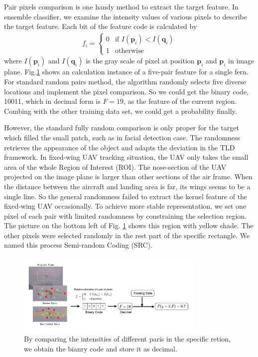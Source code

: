 Pair pixels comparison is one handy method to extract the target feature. In ensemble classifier, we examine the intensity values of various pixels to describe the target feature. Each bit of the feature code is calculated by
\begin{align}
	f_i=\left\{ \begin{array}{ll}
		0 &\mbox{if $I(\mathbf{p}_i) < I(\mathbf{q}_i)$} \\
		1 &\mbox{otherwise} \end{array} \right.
\end{align}
where $I(\mathbf{p}_i)$ and $I(\mathbf{q}_i)$ is the gray scale of pixel at position $\mathbf{p}_i$  and $\mathbf{p}_i$ in image plane. Fig.\ref{fig:01_TLD_Code} shows an calculation instance of a five-pair feature for a single fern. For standard random pairs method, the algorithm randomly selects five diverse locations and implement the pixel comparison. So we could get the binary code, 10011, which in decimal form is $F=19$, as the feature of the current region. Combing with the other training data set, we could get a probability finally.

However, the standard fully random comparison is only proper for the target which filled the small patch, such as in facial detection case. The randomness retrieves the appearance of the object and adapts the deviation in the TLD framework. In fixed-wing UAV tracking situation, the UAV only takes the small area of the whole Region of Interest (ROI). The nose-section of the UAV projected on the image plane is larger than other sections of the air frame. When the distance between the aircraft and landing area is far, its wings seems to be a single line. So the general randomness failed to extract the kernel feature of the fixed-wing UAV occasionally. To achieve more stable representation, we set one pixel of each pair with limited randomness by constraining the selection region. The picture on the bottom left of Fig. \ref{fig:01_TLD_Code} shows this region with yellow shade. The other pixels were selected randomly in the rest part of the specific rectangle. We named this process Semi-random Coding (SRC). 

\begin{figure}[!th]
	\centering
	\includegraphics[width=0.8\textwidth]{Figs/01_TLD_Code.pdf}
	\caption{By comparing the intensities of different paris in the specific retion, we obtain the bianry code and store it as decimal.}
	\label{fig:01_TLD_Code}    
\end{figure}

